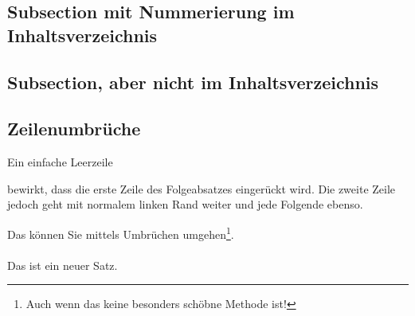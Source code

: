 \subsection{Subsection mit Nummerierung im Inhaltsverzeichnis}

\subsection*{Subsection, aber nicht im Inhaltsverzeichnis}

\subsection{Zeilenumbrüche}

Ein einfache Leerzeile

bewirkt, dass die erste Zeile des Folgeabsatzes eingerückt wird. Die zweite Zeile jedoch geht mit normalem linken Rand weiter und jede Folgende ebenso.

Das können Sie mittels Umbrüchen umgehen\footnote{Auch wenn das keine besonders schöbne Methode ist!}. \\
\ \\ %
Das ist ein neuer Satz. 